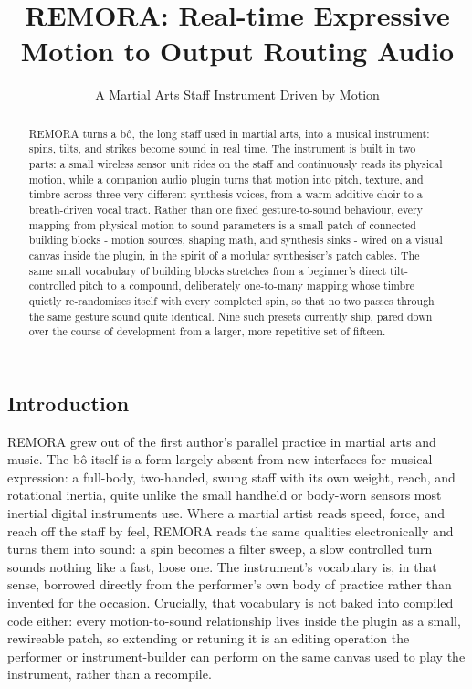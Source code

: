 \documentclass[a4paper,10pt,oneside]{article}
\title{REMORA: Real-time Expressive Motion to Output Routing Audio}
\subtitle{A Martial Arts Staff Instrument Driven by Motion}
\begin{document}
\ninept
\maketitle

\begin{sloppy}

\begin{abstract}
REMORA turns a b\^o, the long staff used in martial arts, into a musical instrument:
spins, tilts, and strikes become sound in real time. The instrument is built in two
parts: a small wireless sensor unit rides on the staff and continuously reads its
physical motion, while a companion audio plugin turns that motion into pitch, texture,
and timbre across three very different synthesis voices, from a warm additive choir to a
breath-driven vocal tract. Rather than one fixed gesture-to-sound behaviour, every
mapping from physical motion to sound parameters is a small patch of connected building
blocks - motion sources, shaping math, and synthesis sinks - wired on a visual canvas
inside the plugin, in the spirit of a modular synthesiser's patch cables. The same small
vocabulary of building blocks stretches from a beginner's direct tilt-controlled pitch to
a compound, deliberately one-to-many mapping whose timbre quietly re-randomises itself
with every completed spin, so that no two passes through the same gesture sound quite
identical. Nine such presets currently ship, pared down over the course of development
from a larger, more repetitive set of fifteen.
\end{abstract}

\section{Introduction}
\label{sec:intro}

REMORA grew out of the first author's parallel practice in martial arts and music. The
b\^o itself is a form largely absent from new interfaces for musical expression: a
full-body, two-handed, swung staff with its own weight, reach, and rotational inertia,
quite unlike the small handheld or body-worn sensors most inertial digital instruments
use. Where a martial artist reads speed, force, and reach off the staff by feel, REMORA
reads the same qualities electronically and turns them into sound: a spin becomes a
filter sweep, a slow controlled turn sounds
nothing like a fast, loose one. The instrument's vocabulary is, in that sense, borrowed
directly from the performer's own body of practice rather than invented for the
occasion. Crucially, that vocabulary is not baked into compiled code either: every
motion-to-sound relationship lives inside the plugin as a small, rewireable patch, so
extending or retuning it is an editing operation the performer or instrument-builder can
perform on the same canvas used to play the instrument, rather than a recompile.


\end{sloppy}
\end{document}
